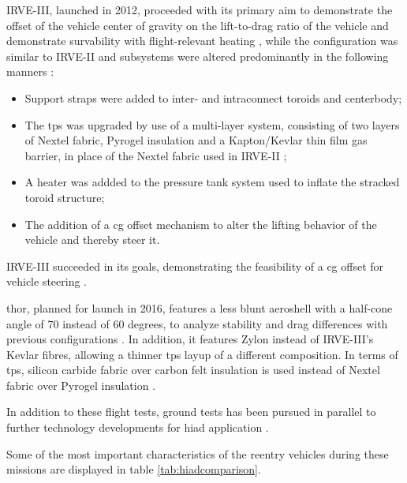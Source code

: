 IRVE-III, launched in 2012, proceeded with its primary aim to demonstrate the offset of the vehicle center of gravity on the lift-to-drag ratio of the vehicle and demonstrate survability with flight-relevant heating \cite{Dillman2012a}, while the configuration was similar to IRVE-II and subsystems were altered predominantly in the following  manners \cite{Dillman2012a}:
\begin{itemize}
\item Support straps were added to inter- and intraconnect toroids and centerbody;
\item The \gls{tps} was upgraded by use of a multi-layer system, consisting of two layers of Nextel fabric, Pyrogel insulation and a Kapton/Kevlar thin film gas barrier, in place of the Nextel fabric used in IRVE-II \cite{Dillman2012}; 
\item A heater was addded to the pressure tank system used to inflate the stracked toroid structure;
\item The addition of a \gls{cg} offset mechanism to alter the lifting behavior of the vehicle and thereby steer it.
\end{itemize}
IRVE-III succeeded in its goals, demonstrating the feasibility of a \gls{cg} offset for vehicle steering \cite{Dillman2012}.

\gls{thor}, planned for launch in 2016, features a less blunt aeroshell with a half-cone angle of 70 instead of 60 degrees, to analyze stability and drag differences with previous \cite{Hughes2005, Dillman2010, Dillman2012} configurations \cite{Dillman2014}. In addition, it features Zylon instead of IRVE-III's Kevlar fibres, allowing a thinner \gls{tps} layup of a different composition. In terms of \gls{tps}, silicon carbide fabric over carbon felt insulation is used instead of Nextel fabric over Pyrogel insulation \cite{Dillman2014}.

In addition to these flight tests, ground tests has been pursued in parallel to further technology developments for \gls{hiad} application \cite{Smith2010}.

Some of the most important characteristics of the reentry vehicles during these missions are displayed in table \ref{tab:hiadcomparison}.

